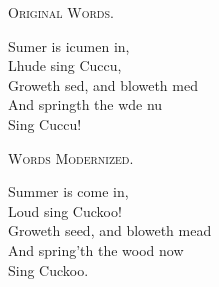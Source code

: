 \settowidth{\versewidth}{Groweth sed, and bloweth med}
\begin{dcverse}
\vin\vin\textsc{Original Words.}

\begin{patverse}
Sumer is icumen in,\\
Lhude sing Cuccu,\\
Groweth sed, and bloweth med\\
And springth the wde nu\\
Sing Cuccu!
\end{patverse}

\vin\vin\textsc{Words Modernized.}

\begin{patverse}
Summer is come in,\\
Loud sing Cuckoo!\\
Groweth seed, and bloweth mead\\
And spring’th the wood now\\
Sing Cuckoo. 
\end{patverse}
\end{dcverse}


\pagebreak